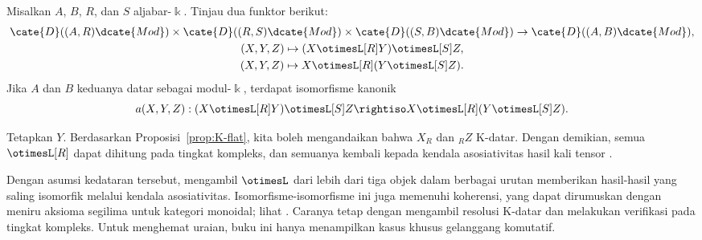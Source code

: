 \begin{proposisi}\label{prop:otimesL-associativity-constraint}
	Misalkan $A$, $B$, $R$, dan $S$ aljabar-$\Bbbk$. Tinjau dua funktor berikut:
	\begin{gather*}
		\cate{D}((A,R)\dcate{Mod}) \times \cate{D}((R,S)\dcate{Mod}) \times \cate{D}((S,B)\dcate{Mod}) \to \cate{D}((A,B)\dcate{Mod}), \\
		(X, Y, Z) \mapsto (X \otimesL[R] Y) \otimesL[S] Z, \\
		(X, Y, Z) \mapsto X \otimesL[R] (Y \otimesL[S] Z).
	\end{gather*}
	Jika $A$ dan $B$ keduanya datar sebagai modul-$\Bbbk$, terdapat
	isomorfisme kanonik
	\[ a(X,Y,Z): (X \otimesL[R] Y) \otimesL[S] Z \rightiso X \otimesL[R] (Y \otimesL[S] Z). \]
\end{proposisi}
\begin{bukti}
	Tetapkan $Y$. Berdasarkan Proposisi~\ref{prop:K-flat}, kita boleh
	mengandaikan bahwa $X_R$ dan ${}_R Z$ K-datar. Dengan demikian, semua
	$\otimesL[R]$ dapat dihitung pada tingkat kompleks, dan semuanya kembali
	kepada kendala asosiativitas hasil kali tensor
	\cite[Proposisi 6.5.12]{Li1}.
\end{bukti}

Dengan asumsi kedataran tersebut, mengambil $\otimesL$ dari lebih dari tiga
objek dalam berbagai urutan memberikan hasil-hasil yang saling isomorfik
melalui kendala asosiativitas. Isomorfisme-isomorfisme ini juga memenuhi
koherensi, yang dapat dirumuskan dengan meniru aksioma segilima untuk kategori
monoidal; lihat \cite[Definisi 3.1.1]{Li1}. Caranya tetap dengan mengambil
	resolusi K-datar dan melakukan verifikasi pada tingkat kompleks. Untuk
menghemat uraian, buku ini hanya menampilkan kasus khusus gelanggang
komutatif.

